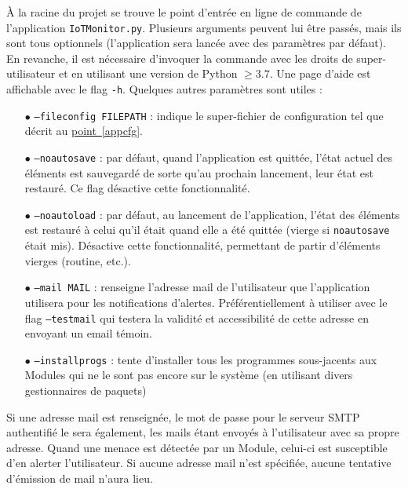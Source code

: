 \documentclass[]{article}
\newcommand{\wordlink}[2]{\hyperref[#1]{#2~\ref{#1}}}
\begin{document}
À la racine du projet se trouve le point d'entrée en ligne de commande de l'application \texttt{IoTMonitor.py}. Plusieurs arguments peuvent lui être passés, mais ils sont tous optionnels (l'application sera lancée avec des paramètres par défaut). En revanche, il est nécessaire d'invoquer la commande avec les droits de super-utilisateur et en utilisant une version de Python $\geq 3.7$. Une page d'aide est affichable avec le flag \texttt{-h}. Quelques autres paramètres sont utiles :\\
\begin{itemize}
\item[$\bullet$] \texttt{--fileconfig FILEPATH} : indique le super-fichier de configuration tel que décrit au \wordlink{appcfg}{point}.
\vspace{0.2cm}
\item[$\bullet$] \texttt{--noautosave} : par défaut, quand l'application est quittée, l'état actuel des éléments est sauvegardé de sorte qu'au prochain lancement, leur état est restauré. Ce flag désactive cette fonctionnalité.
\vspace{0.2cm}
\item[$\bullet$] \texttt{--noautoload} : par défaut, au lancement de l'application, l'état des éléments est restauré à celui qu'il était quand elle a été quittée (vierge si \texttt{noautosave} était mis). Désactive cette fonctionnalité, permettant de partir d'éléments vierges (routine, etc.).
\vspace{0.2cm}
\item[$\bullet$] \texttt{--mail MAIL} : renseigne l'adresse mail de l'utilisateur que l'application utilisera pour les notifications d'alertes. Préférentiellement à utiliser avec le flag \texttt{--testmail} qui testera la validité et accessibilité de cette adresse en envoyant un email témoin.
\vspace{0.2cm}
\item[$\bullet$] \texttt{--installprogs} : tente d'installer tous les programmes sous-jacents aux Modules qui ne le sont pas encore sur le système (en utilisant divers gestionnaires de paquets)
\end{itemize}
\vspace{0.2cm}

\par Si une adresse mail est renseignée, le mot de passe pour le serveur SMTP authentifié le sera également, les mails étant envoyés à l'utilisateur avec sa propre adresse. Quand une menace est détectée par un Module, celui-ci est susceptible d'en alerter l'utilisateur. Si aucune adresse mail n'est spécifiée, aucune tentative d'émission de mail n'aura lieu.\\
\end{document}
